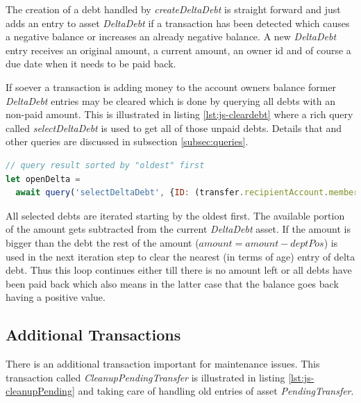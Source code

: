 The creation of a debt handled by \textit{createDeltaDebt} is straight forward and just adds an entry to asset \textit{DeltaDebt} if a transaction has been detected which causes a negative balance or increases an already negative balance. A new \textit{DeltaDebt} entry receives an original amount, a current amount, an owner id and of course a due date when it needs to be paid back.

If soever a transaction is adding money to the account owners balance former \textit{DeltaDebt} entries may be cleared which is done by querying all debts with an non-paid amount. This is illustrated in listing \ref{lst:js-cleardebt} where a rich query called \textit{selectDeltaDebt} is used to get all of those unpaid debts. Details that and other queries are discussed in subsection \ref{subsec:queries}.

\begin{center}
\begin{minipage}{0.8\textwidth}
\small
\begin{lstlisting}[language=javascript,firstnumber=1,caption={\bf\small clearDebt JavaScript excerpt}, captionpos=b,label=lst:js-cleardebt]
// query result sorted by "oldest" first
let openDelta =
  await query('selectDeltaDebt', {ID: (transfer.recipientAccount.member.memberID)});
\end{lstlisting}
\end{minipage}
\end{center}

All selected debts are iterated starting by the oldest first. The available portion of the amount gets subtracted from the current \textit{DeltaDebt} asset. If the amount is bigger than the debt the rest of the amount ($amount = amount - deptPos$) is used in the next iteration step to clear the nearest (in terms of age) entry of delta debt. Thus this loop continues either till there is no amount left or all debts have been paid back which also means in the latter case that the balance goes back having a positive value.

\subsection{Additional Transactions}

There is an additional transaction important for maintenance issues. This transaction called \textit{CleanupPendingTransfer} is illustrated in listing \ref{lst:js-cleanupPending} and taking care of handling old entries of asset \textit{PendingTransfer}.

